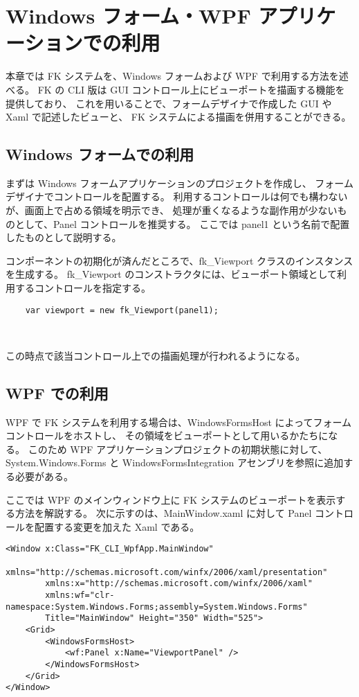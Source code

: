 \section{Windows フォーム・WPF アプリケーションでの利用}

本章では FK システムを、Windows フォームおよび WPF で利用する方法を述べる。
FK の CLI 版は GUI コントロール上にビューポートを描画する機能を提供しており、
これを用いることで、フォームデザイナで作成した GUI や Xaml で記述したビューと、
FK システムによる描画を併用することができる。

\subsection{Windows フォームでの利用}

まずは Windows フォームアプリケーションのプロジェクトを作成し、
フォームデザイナでコントロールを配置する。
利用するコントロールは何でも構わないが、画面上で占める領域を明示でき、
処理が重くなるような副作用が少ないものとして、Panel コントロールを推奨する。
ここでは panel1 という名前で配置したものとして説明する。

コンポーネントの初期化が済んだところで、fk\_Viewport クラスのインスタンスを生成する。
fk\_Viewport のコンストラクタには、ビューポート領域として利用するコントロールを指定する。
\\
\begin{screen}
\begin{verbatim}
    var viewport = new fk_Viewport(panel1);
\end{verbatim}
\end{screen}
~

この時点で該当コントロール上での描画処理が行われるようになる。

\subsection{WPF での利用}

WPF で FK システムを利用する場合は、WindowsFormsHost によってフォームコントロールをホストし、
その領域をビューポートとして用いるかたちになる。
このため WPF アプリケーションプロジェクトの初期状態に対して、
System.Windows.Forms と WindowsFormsIntegration アセンブリを参照に追加する必要がある。

ここでは WPF のメインウィンドウ上に FK システムのビューポートを表示する方法を解説する。
次に示すのは、MainWindow.xaml に対して Panel コントロールを配置する変更を加えた Xaml である。
\\
\begin{screen}
\begin{verbatim}
<Window x:Class="FK_CLI_WpfApp.MainWindow"
        xmlns="http://schemas.microsoft.com/winfx/2006/xaml/presentation"
        xmlns:x="http://schemas.microsoft.com/winfx/2006/xaml"
        xmlns:wf="clr-namespace:System.Windows.Forms;assembly=System.Windows.Forms"
        Title="MainWindow" Height="350" Width="525">
    <Grid>
        <WindowsFormsHost>
            <wf:Panel x:Name="ViewportPanel" />
        </WindowsFormsHost>
    </Grid>
</Window>
\end{verbatim}
\end{screen}
~


